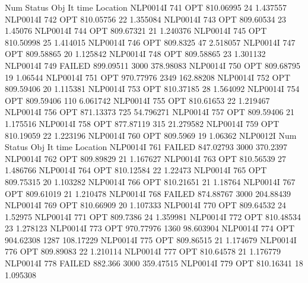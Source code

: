               Num      Status      Obj             It       time                 Location
NLP0014I           741         OPT 810.06995       24 1.437557
NLP0014I           742         OPT 810.05756       22 1.355084
NLP0014I           743         OPT 809.60534       23 1.45076
NLP0014I           744         OPT 809.67321       21 1.240376
NLP0014I           745         OPT 810.50998       25 1.414015
NLP0014I           746         OPT 809.8325       47 2.518057
NLP0014I           747         OPT 809.58865       20 1.125842
NLP0014I           748         OPT 809.58865       23 1.301132
NLP0014I           749      FAILED 899.09511     3000 378.98083
NLP0014I           750         OPT 809.68795       19 1.06544
NLP0014I           751         OPT 970.77976     2349 162.88208
NLP0014I           752         OPT 809.59406       20 1.115381
NLP0014I           753         OPT 810.37185       28 1.564092
NLP0014I           754         OPT 809.59406      110 6.061742
NLP0014I           755         OPT 810.61653       22 1.219467
NLP0014I           756         OPT 871.13373      725 54.796271
NLP0014I           757         OPT 809.59406       21 1.175516
NLP0014I           758         OPT 877.87119      315 21.279582
NLP0014I           759         OPT 810.19059       22 1.223196
NLP0014I           760         OPT 809.5969       19 1.06362
NLP0012I 
              Num      Status      Obj             It       time                 Location
NLP0014I           761      FAILED 847.02793     3000 370.2397
NLP0014I           762         OPT 809.89829       21 1.167627
NLP0014I           763         OPT 810.56539       27 1.486766
NLP0014I           764         OPT 810.12584       22 1.22473
NLP0014I           765         OPT 809.75315       20 1.103282
NLP0014I           766         OPT 810.21651       21 1.18764
NLP0014I           767         OPT 809.61019       21 1.210478
NLP0014I           768      FAILED 874.88767     3000 204.88439
NLP0014I           769         OPT 810.66909       20 1.107333
NLP0014I           770         OPT 809.64532       24 1.52975
NLP0014I           771         OPT 809.7386       24 1.359981
NLP0014I           772         OPT 810.48534       23 1.278123
NLP0014I           773         OPT 970.77976     1360 98.603904
NLP0014I           774         OPT 904.62308     1287 108.17229
NLP0014I           775         OPT 809.86515       21 1.174679
NLP0014I           776         OPT 809.89083       22 1.210114
NLP0014I           777         OPT 810.64578       21 1.176779
NLP0014I           778      FAILED 882.366     3000 359.47515
NLP0014I           779         OPT 810.16341       18 1.095308

